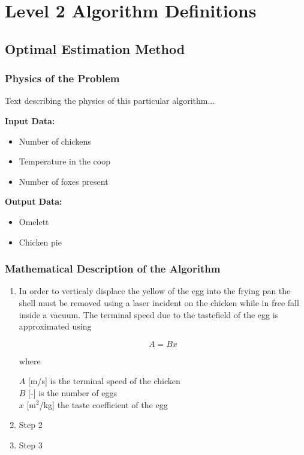 \chapter{Level 2 Algorithm Definitions}
\label{chapter:L2algorithms}
\pagestyle{localfancy}

\section{Optimal Estimation Method}

\subsection{Physics of the Problem}

Text describing the physics of this particular algorithm...

\textbf{ Input Data:}
\begin{itemize}
\item Number of chickens
\item Temperature in the coop
\item Number of foxes present
\end{itemize}


\textbf{Output Data:}
\begin{itemize}
\item Omelett
\item Chicken pie
\end{itemize}


\subsection{Mathematical Description of the Algorithm}

\begin{enumerate}
\item In order to verticaly displace the yellow of the egg into the frying pan the shell must be removed using a laser incident on the chicken while in free fall inside a vacuum. The terminal speed due to the tastefield of the egg is approximated using 

\begin{equation}
A=Bx
\end{equation}


where 

$A$ \hspace{1cm} [m/s] is the terminal speed of the chicken \\
$B$ \hspace{1cm} [-] is the number of eggs \\
$x$ \hspace{1cm} [m$^2$/kg] the taste coefficient of the egg \\


\item Step 2

\item Step 3



\end{enumerate}